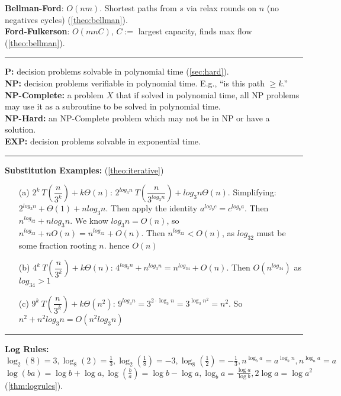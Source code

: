 \textbf{Bellman-Ford}: $O(nm)$. Shortest paths from $s$ via relax rounds on $n$ (no negatives cycles) (\ref{theo:bellman}).\\
\textbf{Ford-Fulkerson}: $O(mnC)$, $C:=$ largest capacity, finds max flow (\ref{theo:bellman}).\\
\noindent\rule{\textwidth}{0.4pt}
\textbf{P:} decision problems solvable in polynomial time (\ref{sec:hard}).\\
\textbf{NP:} decision problems verifiable in polynomial time. E.g., ``is this path $\geq k$.''\\
\textbf{NP-Complete:} a problem $X$ that if solved in polynomial time, all NP problems may use it as a subroutine to be solved in polynomial time.\\
\textbf{NP-Hard:} an NP-Complete problem which may not be in NP or have a solution.\\
\textbf{EXP:} decision problems solvable in exponential time.\\
\noindent\rule{\textwidth}{0.4pt}
\textbf{Substitution Examples:} (\ref{theo:iterative})

\vspace{-.5em}
\begin{itemize}
    \item[(a)] $2^{k}\ T \left(\dfrac{n}{3^k} \right)+k \Theta(n)$: $2^{log_3n}\ T \left(\dfrac{n}{3^{log_3n}} \right)+log_3n \Theta(n)$.
    Simplifying: $2^{log_3n}+\Theta(1)+nlog_3n$. Then apply the identity $a^{log_bc}=c^{log_ba}$.
    Then $n^{log_32}+nlog_3n$. We know $log_3n=O(n)$, so $n^{log_32}+nO(n)=n^{log_32}+O(n)$.
    Then $n^{log_32}<O(n)$, as $log_32$ must be some fraction rooting $n$. hence $O(n)$

    \item[(b)] $4^{k}\ T \left(\dfrac{n}{3^k} \right)+k \Theta(n)$: $4^{log_3n}+n^{log_3n}=n^{log_34}+O(n)$. Then $O(n^{log_34})$ as $log_34>1$
    \item[(c)]  $9^{k}\ T \left(\dfrac{n}{3^k} \right)+k \Theta(n^2)$: $9^{log_3n}=3^{2\cdot\log_3n}=3^{\log_3n^2}=n^2$.
    So $n^2+n^2log_3n = O(n^2log_3n) $
\end{itemize}
\noindent\rule{\textwidth}{0.4pt}
\textbf{Log Rules:} $\log_2(8)=3,\log_8(2)=\frac{1}{3},\log_2(\frac{1}{8})=-3, \log_8(\frac{1}{2})=-\frac{1}{3},n^{\log_ba}=a^{\log_bn},n^{\log_na}=a$\\

\vspace{-1em}
\noindent
$\log(ba)=\log b+\log a,\log(\frac{b}{a})=\log b-\log a,\log_ba=\frac{\log a}{\log b},2\log a= \log a^2$ (\ref{thm:logrules}).




